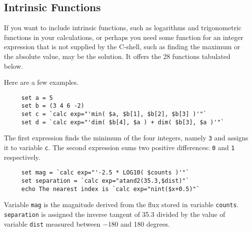 \subsection{Intrinsic Functions
\label{sc4_se_intrinsic}}

If you want to include intrinsic functions, such as logarithms and
trigonometric functions in your calculations, or perhaps you need some
function for an integer expression that is not supplied by the
C-shell, such as finding the maximum or the absolute value,
 may be the solution.  It offers the
28 functions tabulated below.

Here are a few examples.

\small
\begin{verbatim}
     set a = 5
     set b = (3 4 6 -2)
     set c = `calc exp="'min( $a, $b[1], $b[2], $b[3] )'"`
     set d = `calc exp="'dim( $b[4], $a ) + dim( $b[3], $a )'"`
\end{verbatim}
\normalsize
The first expression finds the minimum of the four integers, namely
{\tt 3} and assigns it to variable {\tt c}.  The second expression
sums two positive differences: {\tt 0} and {\tt 1} respectively.

\small
\begin{verbatim}
     set mag = `calc exp="'-2.5 * LOG10( $counts )'"`
     set separation = `calc exp="atand2(35.3,$dist)"`
     echo The nearest index is `calc exp="nint($x+0.5)"`
\end{verbatim}
\normalsize
Variable {\tt mag} is the magnitude derived from the flux
stored in variable {\tt counts}.  {\tt separation} is assigned
the inverse tangent of 35.3 divided by the value of variable
{\tt dist} measured between $-$180 and 180 degrees. 

\bigskip

